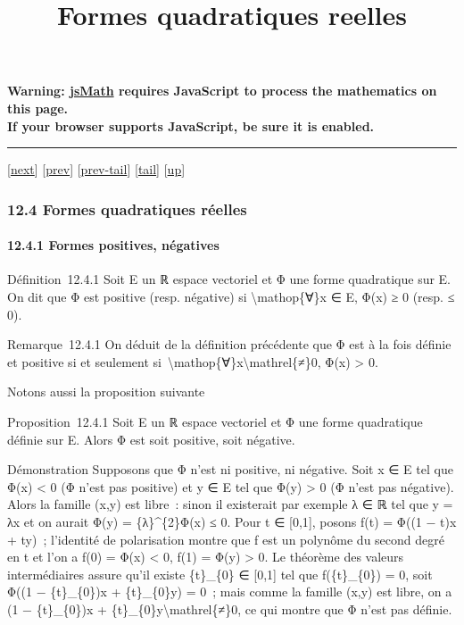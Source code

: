 \documentclass[]{article}
\title{Formes quadratiques reelles}
\author{}
\date{}
\begin{document}
\maketitle

\textbf{Warning: \href{http://www.math.union.edu/locate/jsMath}{jsMath}
requires JavaScript to process the mathematics on this page.\\ If your
browser supports JavaScript, be sure it is enabled.}

\begin{center}\rule{3in}{0.4pt}\end{center}

{[}\href{coursse71.html}{next}{]} {[}\href{coursse69.html}{prev}{]}
{[}\href{coursse69.html\#tailcoursse69.html}{prev-tail}{]}
{[}\hyperref[tailcoursse70.html]{tail}{]}
{[}\href{coursch13.html\#coursse70.html}{up}{]}

\subsubsection{12.4 Formes quadratiques réelles}

\paragraph{12.4.1 Formes positives, négatives}

Définition~12.4.1 Soit E un ℝ espace vectoriel et Φ une forme
quadratique sur E. On dit que Φ est positive (resp. négative) si
\textbackslash{}mathop\{∀\}x ∈ E, Φ(x) ≥ 0 (resp. ≤ 0).

Remarque~12.4.1 On déduit de la définition précédente que Φ est à la
fois définie et positive si et seulement
si~\textbackslash{}mathop\{∀\}x\textbackslash{}mathrel\{≠\}0, Φ(x)
\textgreater{} 0.

Notons aussi la proposition suivante

Proposition~12.4.1 Soit E un ℝ espace vectoriel et Φ une forme
quadratique définie sur E. Alors Φ est soit positive, soit négative.

Démonstration Supposons que Φ n'est ni positive, ni négative. Soit x ∈ E
tel que Φ(x) \textless{} 0 (Φ n'est pas positive) et y ∈ E tel que Φ(y)
\textgreater{} 0 (Φ n'est pas négative). Alors la famille (x,y) est
libre~: sinon il existerait par exemple λ ∈ ℝ tel que y = λx et on
aurait Φ(y) = \{λ\}\^{}\{2\}Φ(x) ≤ 0. Pour t ∈ {[}0,1{]}, posons f(t) =
Φ((1 − t)x + ty)~; l'identité de polarisation montre que f est un
polynôme du second degré en t et l'on a f(0) = Φ(x) \textless{} 0, f(1)
= Φ(y) \textgreater{} 0. Le théorème des valeurs intermédiaires assure
qu'il existe \{t\}\_\{0\} ∈ {[}0,1{]} tel que f(\{t\}\_\{0\}) = 0, soit
Φ((1 − \{t\}\_\{0\})x + \{t\}\_\{0\}y) = 0~; mais comme la famille (x,y)
est libre, on a (1 − \{t\}\_\{0\})x +
\{t\}\_\{0\}y\textbackslash{}mathrel\{≠\}0, ce qui montre que Φ n'est
pas définie.
\end{document}

